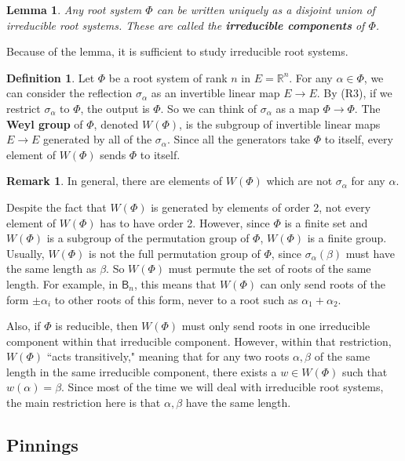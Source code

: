 \documentclass[12pt]{article}
\newtheorem{lemma}[theorem]{Lemma}
\theoremstyle{definition}
\newtheorem{definition}[theorem]{Definition}
\newtheorem{remark}[theorem]{Remark}
\newcommand{\R}{\mathbb{R}}
\newcommand{\sig}{\sigma}
\newcommand{\tbf}{\textbf}
\newcommand{\noi}{\noindent}
\begin{document}
\begin{lemma}
Any root system $\Phi$ can be written uniquely as a disjoint union of irreducible root systems. These are called the \tbf{irreducible components} of $\Phi$.
\end{lemma}

\noi Because of the lemma, it is sufficient to study irreducible root systems.

\begin{definition}
Let $\Phi$ be a root system of rank $n$ in $E = \R^n$. For any $\alpha \in \Phi$, we can consider the reflection $\sig_\alpha$ as an invertible linear map $E \to E$. By (R3), if we restrict $\sig_\alpha$ to $\Phi$, the output is $\Phi$. So we can think of $\sig_\alpha$ as a map $\Phi \to \Phi$. The \tbf{Weyl group} of $\Phi$, denoted $W(\Phi)$, is the subgroup of invertible linear maps $E \to E$ generated by all of the $\sig_\alpha$. Since all the generators take $\Phi$ to itself, every element of $W(\Phi)$ sends $\Phi$ to itself. 
\end{definition}

\begin{remark}
In general, there are elements of $W(\Phi)$ which are not $\sig_\alpha$ for any $\alpha$. 

Despite the fact that $W(\Phi)$ is generated by elements of order 2, not every element of $W(\Phi)$ has to have order 2. However, since $\Phi$ is a finite set and $W(\Phi)$ is a subgroup of the permutation group of $\Phi$, $W(\Phi)$ is a finite group. Usually, $W(\Phi)$ is not the full permutation group of $\Phi$, since $\sig_\alpha(\beta)$ must have the same length as $\beta$. So $W(\Phi)$ must permute the set of roots of the same length. For example, in $\mathsf{B}_n$, this means that $W(\Phi)$ can only send roots of the form $\pm \alpha_i$ to other roots of this form, never to a root such as $\alpha_1 + \alpha_2$. 

Also, if $\Phi$ is reducible, then $W(\Phi)$ must only send roots in one irreducible component within that irreducible component. However, within that restriction, $W(\Phi)$ ``acts transitively," meaning that for any two roots $\alpha, \beta$ of the same length in the same irreducible component, there exists a $w \in W(\Phi)$ such that $w(\alpha) = \beta$. Since most of the time we will deal with irreducible root systems, the main restriction here is that $\alpha, \beta$ have the same length.
\end{remark}


\subsection{Pinnings}
\label{pinnings}
\end{document}
